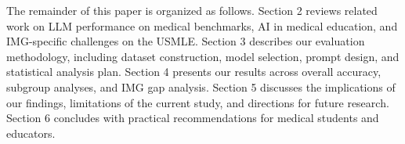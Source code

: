 The remainder of this paper is organized as follows. Section 2 reviews related work on LLM performance on medical benchmarks, AI in medical education, and IMG-specific challenges on the USMLE. Section 3 describes our evaluation methodology, including dataset construction, model selection, prompt design, and statistical analysis plan. Section 4 presents our results across overall accuracy, subgroup analyses, and IMG gap analysis. Section 5 discusses the implications of our findings, limitations of the current study, and directions for future research. Section 6 concludes with practical recommendations for medical students and educators.
